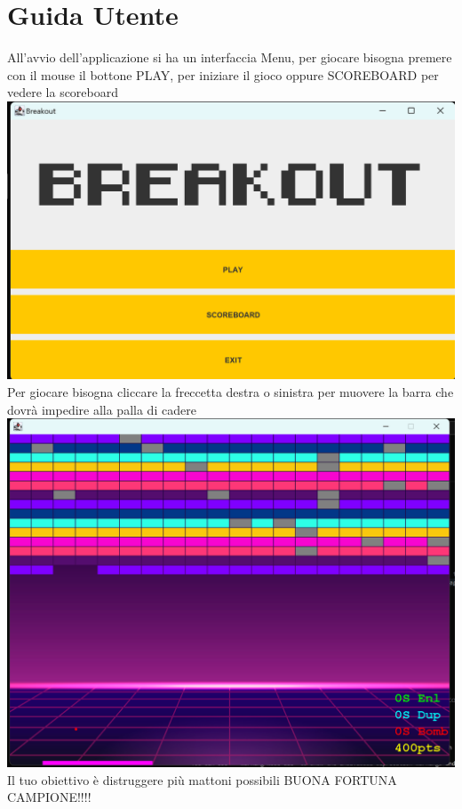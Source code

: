 \documentclass[a4paper,12pt]{report}
\begin{document}
\chapter{Guida Utente}
All'avvio dell'applicazione si ha un interfaccia Menu, per giocare bisogna premere con il mouse il bottone PLAY, per iniziare il gioco oppure SCOREBOARD per vedere la scoreboard
\newline
\includegraphics[width=\textwidth]{Menu.png}
\newline
Per giocare bisogna cliccare la freccetta destra o sinistra per muovere la barra che dovrà impedire alla palla di cadere
\newline
\includegraphics[width=\textwidth]{Game.png}
\newline
Il tuo obiettivo è distruggere più mattoni possibili
\newline
\newline
BUONA FORTUNA CAMPIONE!!!!
\end{document}
